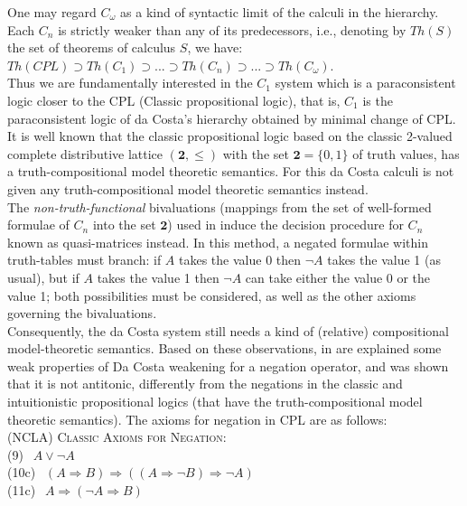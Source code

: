 \documentclass{llncs}
\begin{document}
 One may regard $C_{\omega}$ as a kind of syntactic limit \cite{CaMa99} of the
 calculi in the hierarchy.\\
 Each $C_n$ is strictly weaker than any of its predecessors, i.e.,
 denoting by $Th(S)$ the set of theorems of  calculus $S$, we
 have:\\
 $Th(CPL) \supset Th(C_1) \supset ... \supset Th(C_n) \supset...\supset
 Th(C_\omega)$.\\
 Thus we are fundamentally interested in the $C_1$ system which is a paraconsistent logic
 closer  to the CPL (Classic propositional logic), that is, $C_1$ is the paraconsistent
 logic of da Costa's hierarchy
 obtained by minimal change of CPL.\\
 It is well known that the classic propositional logic based on the classic 2-valued complete distributive lattice $(\textbf{2},
 \leq)$ with  the set $\textbf{2} = \{0, 1\}$ of truth values, has a
 truth-compositional model theoretic semantics.
 For this da Costa calculi is not given any truth-compositional
 model  theoretic semantics instead.\\
  The \emph{non-truth-functional} bivaluations (mappings from the set of well-formed formulae of
 $C_n$ into the set $\textbf{2}$) used in \cite{CoAl77,LoAl80}
 induce the decision procedure for $C_n$ known as quasi-matrices
 instead. In this method, a negated formulae within truth-tables
 must branch: if $A$ takes the value 0 then $\neg A$ takes the value
 1 (as usual), but if $A$ takes the value 1 then $\neg A$ can take
 either the value 0 or the value 1; both possibilities must be
 considered, as well as the other axioms governing the
 bivaluations.\\
  Consequently, the da Costa system still
 needs a kind of (relative) compositional model-theoretic
 semantics.
 Based on these observations, in \cite{Majk08dc}   are explained some weak properties of Da Costa
 weakening for a negation operator, and was shown that it is not antitonic, differently from the negations in the classic
  and intuitionistic propositional logics (that
 have the truth-compositional
 model  theoretic semantics).
 The axioms for negation in CPL are as follows:\\
 \textsc{(NCLA) Classic Axioms for Negation:} \\
(9) $~~A \vee \neg A$\\
(10c) $~~(A\Rightarrow B) \Rightarrow ((A \Rightarrow \neg B) \Rightarrow \neg A)$\\
(11c) $~~A \Rightarrow (\neg A \Rightarrow B)$\\
\end{document}
